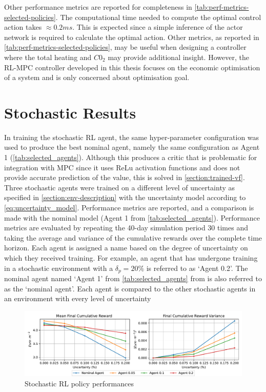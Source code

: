 Other performance metrics are reported for completeness in \autoref{tab:perf-metrics-selected-policies}. The computational time needed to compute the optimal control action takes $\approx 0.2ms$. This is expected since a simple inference of the actor network is required to calculate the optimal action. Other metrics, as reported in \autoref{tab:perf-metrics-selected-policies}, may be useful when designing a controller where the total heating and $C0_2$ may provide additional insight. However, the RL-MPC controller developed in this thesis focuses on the economic optimisation of a system and is only concerned about optimisation goal.

\section{Stochastic Results} \label{section:rl-stochastic-results}
In training the stochastic RL agent, the same hyper-parameter configuration was used to produce the best nominal agent, namely the same configuration as Agent 1 (\autoref{tab:selected_agents}). Although this produces a critic that is problematic for integration with MPC since it uses ReLu activation functions and does not provide accurate prediction of the value, this is solved in \autoref{section:trained-vf}. Three stochastic agents were trained on a different level of uncertainty as specified in \autoref{section:env-description} with the uncertainty model according to \autoref{eq:uncertainty_model}. Performance metrics are reported, and a comparison is made with the nominal model (Agent 1 from \autoref{tab:selected_agents}). Performance metrics are evaluated by repeating the 40-day simulation period 30 times and taking the average and variance of the cumulative rewards over the complete time horizon. Each agent is assigned a name based on the degree of uncertainty on which they received training. For example, an agent that has undergone training in a stochastic environment with a $\delta_p= 20\%$ is referred to as ‘Agent 0.2’. The nominal agent named ‘Agent 1’ from \autoref{tab:selected_agents} from is also referred to as the ‘nominal agent’. Each agent is compared to the other stochastic agents in an environment with every level of uncertainty

\begin{figure}[H]
    \centering
    \includegraphics[width = \textwidth]{figures/stochastic_rl_policies.pdf}
    \caption{Stochastic RL policy performances}
    \label{fig:stochastic-rl-policies}
\end{figure}

